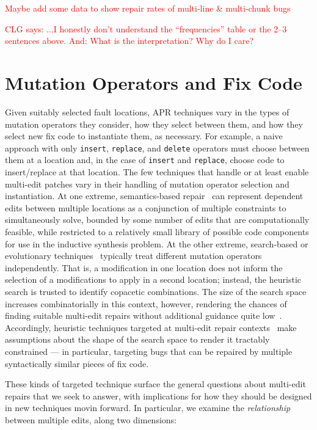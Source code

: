 \documentclass[sigconf, timestamp-false, anonymous=true]{acmart}
\newcommand\todo[1]{\textcolor{red}{#1}}
\begin{document}
\todo{Maybe add some data to show repair rates of multi-line \& multi-chunk bugs}

\todo{CLG says: ...I honestly don't understand the ``frequencies'' table or the
  2--3 sentences above. And: What is the interpretation?
  Why do I care?}






\section{Mutation Operators and Fix Code}
\label{sec:mutops}

Given suitably selected fault locations, APR techniques vary in the types of
mutation operators they consider, how they select between them, and how they
select new fix code to instantiate them, as necessary.  For example, a naive
approach with only \texttt{insert}, \texttt{replace}, and \texttt{delete}
operators must choose between them at a location and, in the case of
\texttt{insert} and \texttt{replace}, choose code to insert/replace at that
location.  
%
The few techniques that handle or at least enable multi-edit patches vary in their
handling of mutation operator selection and instantiation.  At one
extreme, semantics-based repair~\cite{s3,angelix} can represent dependent edits between multiple
locations as a conjunction of multiple constraints to simultaneously solve,
bounded by some number of edits that are computationally feasible, while
restricted to a relatively small library of possible code components for use in
the inductive synthesis problem.    At the other extreme, search-based or
evolutionary techniques~\cite{genprog,others} typically treat different mutation
operators independently.  That is, a modification in one location does not
inform the selection of a modifications to apply in a second location; instead,
the heuristic search is trusted to identify copacetic combinations.  The size of
the search space increases combinatorially in this context, however, rendering
the chances of finding suitable multi-edit repairs without additional guidance
quite low~\cite{ae,long2016}. Accordingly, heuristic techniques targeted at multi-edit
repair contexts~\cite{hercules,maybewang2018} make assumptions about the
shape of the search space to render it tractably constrained --- in particular,
targeting bugs that can be repaired by multiple syntactically similar pieces of
fix code.

These kinds of targeted technique surface the general questions about
multi-edit repairs that we seek to answer, with
implications for how they should be designed in new techniques movin forward.
In particular, we examine the \emph{relationship} between multiple edits, along
two dimensions:
\end{document}
